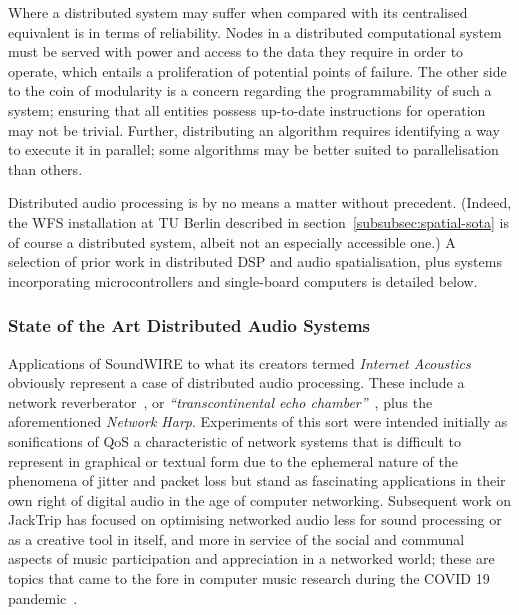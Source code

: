 \documentclass[utf8]{FrontiersinHarvard}
\newcommand{\secref}[1]{section~\ref{#1}}
\begin{document}
    Where a distributed system may suffer when compared with its centralised
    equivalent is in terms of reliability.
    Nodes in a distributed computational system must be served with power and access
    to the data they require in order to operate, which entails a proliferation of
    potential points of failure.
    The other side to the coin of modularity is a concern regarding the
    programmability of such a system;
    ensuring that all entities possess up-to-date instructions for operation may not
    be trivial.
    Further, distributing an algorithm requires identifying a way to execute it in
    parallel;
    some algorithms may be better suited to parallelisation than others.

    Distributed audio processing is by no means a matter without precedent.
    (Indeed, the WFS installation at TU Berlin described in
    \secref{subsubsec:spatial-sota} is of course a distributed system, albeit not
    an especially accessible one.)
    A selection of prior work in distributed DSP and audio spatialisation, plus
    systems incorporating microcontrollers and single-board computers is detailed
    below.

    \subsubsection{State of the Art Distributed Audio Systems}


    Applications of SoundWIRE to what its creators termed \textit{Internet
    Acoustics}~\citep{chafe_physical_2002} obviously represent a case of
    distributed audio processing.
    These include a network reverberator~\citep{chafe_i_2018}, or
    \textit{``transcontinental echo chamber''}~\citep{chafe_simplified_2000},
    plus the aforementioned \textit{Network Harp}.
    Experiments of this sort were intended initially as sonifications of QoS
    \textemdash{} a characteristic of network systems that is difficult to
    represent in graphical or textual form due to the ephemeral nature of the
    phenomena of jitter and packet loss \textemdash{} but stand as fascinating
    applications in their own right of digital audio in the age of computer
    networking.
    Subsequent work on JackTrip has focused on optimising networked audio less
    for sound processing or as a creative tool in itself, and more in service of
    the social and communal aspects of music participation and appreciation in a
    networked world;
    these are topics that came to the fore in computer music research during the
    COVID 19 pandemic~\citep{bosi_experiencing_2021,
        sacchetto_jacktrip-webrtc_2021}.
\end{document}
